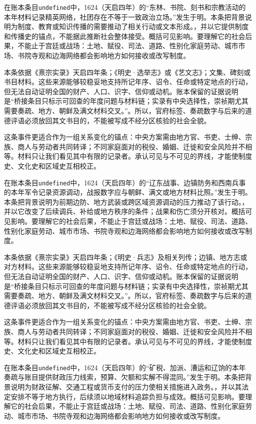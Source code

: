 在账本条目\texttt{undefined}中，1624（天启四年）的“东林、书院、刻书和宗教活动的本年材料记录精英网络，社团存在不等于一致政治立场。”发生于明。本条把背景说明为制度、教育或知识传播的需要推动了相关行动或文本形成。，并以它提供制度和传播史的锚点，不能据此推断社会整体接受。概括可见影响。要理解它的社会后果，不能止于宫廷或战场：土地、赋役、司法、道路、性别化家庭劳动、城市市场、书院寺观和边海网络都会影响地方如何接收或改写制度。

本条依据《熹宗实录》天启四年条；《明史·选举志》或《艺文志》；文集、碑刻或书目材料。这些来源能够较稳妥地支持所记年序、诏令、任命或特定地点的行动，但无法自动证明全国的财产、人口、识字、信仰或动机。账本保留的证据说明是“桥接条目只标示可回查的年度问题与材料链；实录有中央选择性，崇祯期尤其需要奏疏、地方、朝鲜及满文材料交叉。”。所以，官府标签、奏疏数字与后来的道德评语必须放回其文书目的，不能被写成不经分区核验的社会全貌。

这条事件更适合作为一组关系变化的锚点：中央方案需由地方官、书吏、士绅、宗族、商人与劳动者共同转译；不同家庭面对的税役、婚姻、迁徙和安全风险并不相等。材料只让我们看见其中有限的记录者。承认可见与不可见的界线，才能使制度史、文化史和区域史互相校正。

在账本条目\texttt{undefined}中，1624（天启四年）的“辽东战事、边镇防务和西南兵事的本年军令记录资源调动，战报数字应与朝鲜、满文或地方材料比照。”发生于明。本条把背景说明为前期边防、地方武装或跨区域资源调动的压力推动了该行动。，并以它改变了后续调兵、补给或地方秩序的条件；战果和伤亡须分开核对。概括可见影响。要理解它的社会后果，不能止于宫廷或战场：土地、赋役、司法、道路、性别化家庭劳动、城市市场、书院寺观和边海网络都会影响地方如何接收或改写制度。

本条依据《熹宗实录》天启四年条；《明史·兵志》及相关列传；边镇、地方志或对方材料。这些来源能够较稳妥地支持所记年序、诏令、任命或特定地点的行动，但无法自动证明全国的财产、人口、识字、信仰或动机。账本保留的证据说明是“桥接条目只标示可回查的年度问题与材料链；实录有中央选择性，崇祯期尤其需要奏疏、地方、朝鲜及满文材料交叉。”。所以，官府标签、奏疏数字与后来的道德评语必须放回其文书目的，不能被写成不经分区核验的社会全貌。

这条事件更适合作为一组关系变化的锚点：中央方案需由地方官、书吏、士绅、宗族、商人与劳动者共同转译；不同家庭面对的税役、婚姻、迁徙和安全风险并不相等。材料只让我们看见其中有限的记录者。承认可见与不可见的界线，才能使制度史、文化史和区域史互相校正。

在账本条目\texttt{undefined}中，1624（天启四年）的“矿税、加派、漕运和辽饷的本年奏疏与账目提供财政压力线索，预算、欠额和实解不得混同。”发生于明。本条把背景说明为财政征解、交通工程或货币支付的压力使相关措施进入政务。，并以其法定安排不等于地方执行，后续须以地域材料追踪负担与成效。概括可见影响。要理解它的社会后果，不能止于宫廷或战场：土地、赋役、司法、道路、性别化家庭劳动、城市市场、书院寺观和边海网络都会影响地方如何接收或改写制度。

